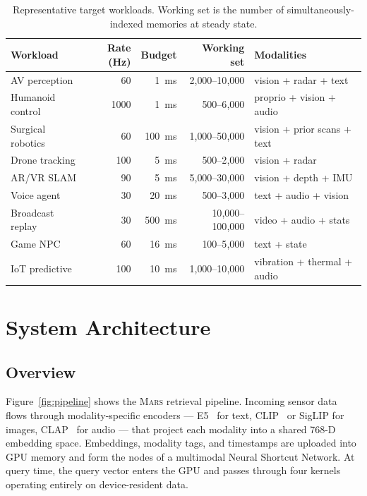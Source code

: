 \documentclass[11pt]{article}
\newcommand{\mars}{\textsc{Mars}}
\begin{document}
\begin{table}[ht]
\centering
\small
\caption{Representative target workloads. Working set is the number of
simultaneously-indexed memories at steady state.}
\label{tab:workloads}
\begin{tabular}{lrrrl}
\toprule
\textbf{Workload} & \textbf{Rate (Hz)} & \textbf{Budget} & \textbf{Working set} & \textbf{Modalities} \\
\midrule
AV perception      &  60 & 1~ms      &  2{,}000--10{,}000 & vision + radar + text \\
Humanoid control   & 1000 & 1~ms     &    500--6{,}000    & proprio + vision + audio \\
Surgical robotics  &  60 & 100~ms    &  1{,}000--50{,}000 & vision + prior scans + text \\
Drone tracking     & 100 & 5~ms      &    500--2{,}000    & vision + radar \\
AR/VR SLAM         &  90 & 5~ms      &  5{,}000--30{,}000 & vision + depth + IMU \\
Voice agent        &  30 & 20~ms     &    500--3{,}000    & text + audio + vision \\
Broadcast replay   &  30 & 500~ms    & 10{,}000--100{,}000 & video + audio + stats \\
Game NPC           &  60 & 16~ms     &    100--5{,}000    & text + state \\
IoT predictive     & 100 & 10~ms     &  1{,}000--10{,}000 & vibration + thermal + audio \\
\bottomrule
\end{tabular}
\end{table}

\section{System Architecture}
\label{sec:architecture}

\subsection{Overview}

Figure~\ref{fig:pipeline} shows the \mars{} retrieval pipeline. Incoming
sensor data flows through modality-specific encoders --- E5~\cite{e5}
for text, CLIP~\cite{clip} or SigLIP for images, CLAP~\cite{clap} for
audio --- that project each modality into a shared 768-D embedding
space. Embeddings, modality tags, and timestamps are uploaded into GPU
memory and form the nodes of a multimodal Neural Shortcut Network. At
query time, the query vector enters the GPU and passes through four
kernels operating entirely on device-resident data.
\end{document}
